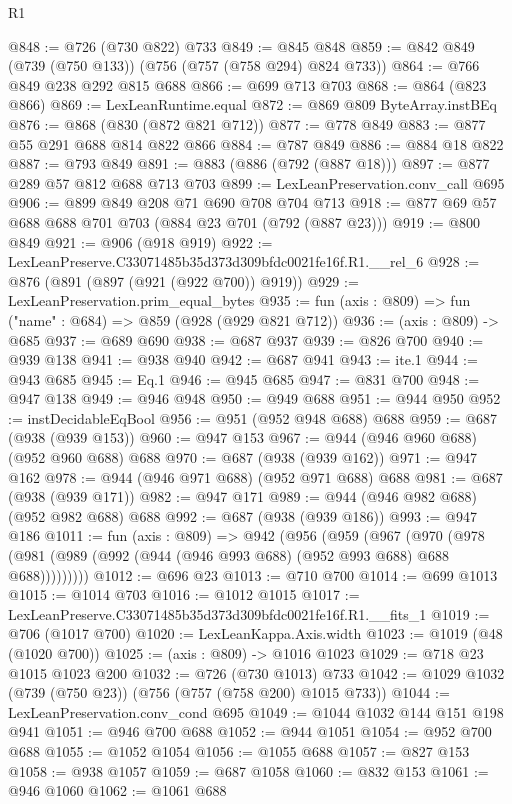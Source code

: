 \begin{lexlean}{R1}
\begin{coremodule}
@848 := @726 (@730 @822) @733
@849 := @845 @848
@859 := @842 @849 (@739 (@750 @133)) (@756 (@757 (@758 @294) @824 @733))
@864 := @766 @849 @238 @292 @815 @688
@866 := @699 @713 @703
@868 := @864 (@823 @866)
@869 := LexLeanRuntime.equal
@872 := @869 @809 ByteArray.instBEq
@876 := @868 (@830 (@872 @821 @712))
@877 := @778 @849
@883 := @877 @55 @291 @688 @814 @822 @866
@884 := @787 @849
@886 := @884 @18 @822
@887 := @793 @849
@891 := @883 (@886 (@792 (@887 @18)))
@897 := @877 @289 @57 @812 @688 @713 @703
@899 := LexLeanPreservation.conv_call @695
@906 := @899 @849 @208 @71 @690 @708 @704 @713
@918 := @877 @69 @57 @688 @688 @701 @703 (@884 @23 @701 (@792 (@887 @23)))
@919 := @800 @849
@921 := @906 (@918 @919)
@922 := LexLeanPreserve.C33071485b35d373d309bfdc0021fe16f.R1.__rel_6
@928 := @876 (@891 (@897 (@921 (@922 @700)) @919))
@929 := LexLeanPreservation.prim_equal_bytes
@935 := fun (axis : @809) => fun ("name" : @684) => @859 (@928 (@929 @821 @712))
@936 := (axis : @809) -> @685
@937 := @689 @690
@938 := @687 @937
@939 := @826 @700
@940 := @939 @138
@941 := @938 @940
@942 := @687 @941
@943 := ite.{1}
@944 := @943 @685
@945 := Eq.{1}
@946 := @945 @685
@947 := @831 @700
@948 := @947 @138
@949 := @946 @948
@950 := @949 @688
@951 := @944 @950
@952 := instDecidableEqBool
@956 := @951 (@952 @948 @688) @688
@959 := @687 (@938 (@939 @153))
@960 := @947 @153
@967 := @944 (@946 @960 @688) (@952 @960 @688) @688
@970 := @687 (@938 (@939 @162))
@971 := @947 @162
@978 := @944 (@946 @971 @688) (@952 @971 @688) @688
@981 := @687 (@938 (@939 @171))
@982 := @947 @171
@989 := @944 (@946 @982 @688) (@952 @982 @688) @688
@992 := @687 (@938 (@939 @186))
@993 := @947 @186
@1011 := fun (axis : @809) =>
  @942
    (@956
      (@959
        (@967
          (@970 (@978 (@981 (@989 (@992 (@944 (@946 @993 @688) (@952 @993 @688) @688 @688)))))))))
@1012 := @696 @23
@1013 := @710 @700
@1014 := @699 @1013
@1015 := @1014 @703
@1016 := @1012 @1015
@1017 := LexLeanPreserve.C33071485b35d373d309bfdc0021fe16f.R1.__fits_1
@1019 := @706 (@1017 @700)
@1020 := LexLeanKappa.Axis.width
@1023 := @1019 (@48 (@1020 @700))
@1025 := (axis : @809) -> @1016 @1023
@1029 := @718 @23 @1015 @1023 @200
@1032 := @726 (@730 @1013) @733
@1042 := @1029 @1032 (@739 (@750 @23)) (@756 (@757 (@758 @200) @1015 @733))
@1044 := LexLeanPreservation.conv_cond @695
@1049 := @1044 @1032 @144 @151 @198 @941
@1051 := @946 @700 @688
@1052 := @944 @1051
@1054 := @952 @700 @688
@1055 := @1052 @1054
@1056 := @1055 @688
@1057 := @827 @153
@1058 := @938 @1057
@1059 := @687 @1058
@1060 := @832 @153
@1061 := @946 @1060
@1062 := @1061 @688

\end{coremodule}
\end{lexlean}
